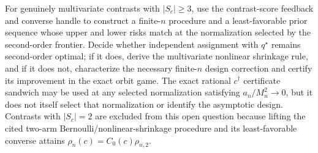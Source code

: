 For genuinely multivariate contrasts with \(|S_c|\geq3\), use the contrast-score feedback and converse handle to construct a finite-\(n\) procedure and a least-favorable prior sequence whose upper and lower risks match at the normalization selected by the second-order frontier.  Decide whether independent assignment with \(q^\star\) remains second-order optimal; if it does, derive the multivariate nonlinear shrinkage rule, and if it does not, characterize the necessary finite-\(n\) design correction and certify its improvement in the exact orbit game.  The exact rational \(c^\dagger\) certificate sandwich may be used at any selected normalization satisfying \(a_n/M_n^2\to0\), but it does not itself select that normalization or identify the asymptotic design.  Contrasts with \(|S_c|=2\) are excluded from this open question because lifting the cited two-arm Bernoulli/nonlinear-shrinkage procedure and its least-favorable converse attains \(\rho_n(c)=C_0(c)\rho_{n,2}\).